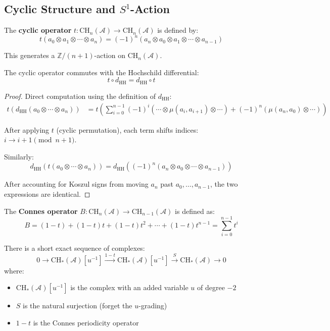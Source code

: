\subsection{Cyclic Structure and $S^1$-Action}

\begin{definition}
\label{def:cyclic-operator}
The \textbf{cyclic operator} $t: \text{CH}_n(\mathcal{A}) \to \text{CH}_n(\mathcal{A})$ 
is defined by:
$$t(a_0 \otimes a_1 \otimes \cdots \otimes a_n) = (-1)^n (a_n \otimes a_0 \otimes a_1 
   \otimes \cdots \otimes a_{n-1})$$

This generates a $\mathbb{Z}/(n+1)$-action on $\text{CH}_n(\mathcal{A})$.
\end{definition}

\begin{lemma}
\label{lem:cyclic-commutes}
The cyclic operator commutes with the Hochschild differential:
$$t \circ d_{\text{HH}} = d_{\text{HH}} \circ t$$
\end{lemma}

\begin{proof}
Direct computation using the definition of $d_{\text{HH}}$:
\begin{align*}
t(d_{\text{HH}}(a_0 \otimes \cdots \otimes a_n))
&= t\left(\sum_{i=0}^{n-1} (-1)^i (\cdots \otimes \mu(a_i,a_{i+1}) \otimes \cdots) 
   + (-1)^n (\mu(a_n,a_0) \otimes \cdots)\right)
\end{align*}

After applying $t$ (cyclic permutation), each term shifts indices: $i \to i+1 \pmod{n+1}$.

Similarly:
$$d_{\text{HH}}(t(a_0 \otimes \cdots \otimes a_n)) = 
   d_{\text{HH}}((-1)^n(a_n \otimes a_0 \otimes \cdots \otimes a_{n-1}))$$

After accounting for Koszul signs from moving $a_n$ past $a_0, \ldots, a_{n-1}$, 
the two expressions are identical.
\end{proof}

\begin{definition}
\label{def:connes-B}
The \textbf{Connes operator} $B: \text{CH}_n(\mathcal{A}) \to \text{CH}_{n-1}(\mathcal{A})$ 
is defined as:
$$B = (1-t) + (1-t)t + (1-t)t^2 + \cdots + (1-t)t^{n-1} = \sum_{i=0}^{n-1} t^i$$
\end{definition}

\begin{theorem}
\label{thm:connes-exact-sequence}
There is a short exact sequence of complexes:
$$0 \to \text{CH}_*(\mathcal{A})[u^{-1}] \xrightarrow{1-t} 
   \text{CH}_*(\mathcal{A})[u^{-1}] \xrightarrow{S} \text{CH}_*(\mathcal{A}) \to 0$$
where:
\begin{itemize}
\item $\text{CH}_*(\mathcal{A})[u^{-1}]$ is the complex with an added variable $u$ 
of degree $-2$
\item $S$ is the natural surjection (forget the $u$-grading)
\item $1-t$ is the Connes periodicity operator
\end{itemize}
\end{theorem}


